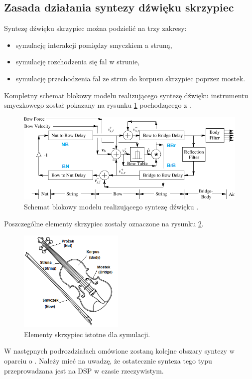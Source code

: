 \subsection{Zasada działania syntezy dźwięku skrzypiec}
Syntezę dźwięku skrzypiec można podzielić na trzy zakresy:
\begin{itemize}
	\setlength\itemsep{-3pt}
	\item symulację interakcji pomiędzy smyczkiem a struną,
	\item symulację rozchodzenia się fal w strunie,
	\item symulację przechodzenia fal ze strun do korpusu skrzypiec poprzez mostek.
\end{itemize}
Kompletny schemat blokowy modelu realizującego syntezę dźwięku instrumentu smyczkowego został pokazany na rysunku \ref{rys:schematblokowy} pochodzącego z \cite{bowed_3}.
\begin{figure}[H]
	\centering
	\includegraphics[width=12cm]{grafiki/schematblokowy}
	\captionsetup{justification=centering}
	\caption{Schemat blokowy modelu realizującego syntezę dźwięku \cite{bowed_3}.}
	\label{rys:schematblokowy}
\end{figure}
Poszczególne elementy skrzypiec zostały oznaczone na rysunku \ref{rys:skrzypce}.
\begin{figure}[H]
	\centering
	\includegraphics[width=5cm]{grafiki/skrzypce}
	\captionsetup{justification=centering}
	\caption{Elementy skrzypiec istotne dla symulacji.}
	\label{rys:skrzypce}
\end{figure}

W następnych podrozdziałach omówione zostaną kolejne obszary syntezy w oparciu o \cite{bowed_smith}. Należy mieć na uwadzę, że ostatecznie synteza tego typu przeprowadzana jest na DSP w czasie rzeczywistym.


